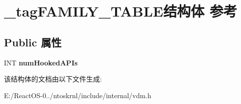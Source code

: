 \hypertarget{struct__tag_f_a_m_i_l_y___t_a_b_l_e}{}\section{\+\_\+tag\+F\+A\+M\+I\+L\+Y\+\_\+\+T\+A\+B\+L\+E结构体 参考}
\label{struct__tag_f_a_m_i_l_y___t_a_b_l_e}
\subsection*{Public 属性}
\begin{DoxyCompactItemize}
\item 
\mbox{\label{struct__tag_f_a_m_i_l_y___t_a_b_l_e_a317c240a1a8d740fb742de2d676b037c}} 
I\+NT {\bfseries num\+Hooked\+A\+P\+Is}
\end{DoxyCompactItemize}


该结构体的文档由以下文件生成\+:\begin{DoxyCompactItemize}
\item 
E\+:/\+React\+O\+S-\/0../ntoskrnl/include/internal/vdm.\+h\end{DoxyCompactItemize}
